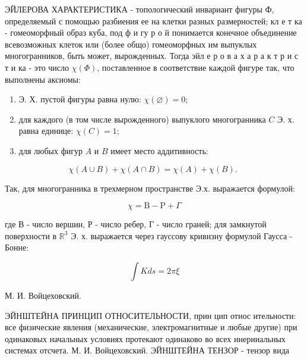 \documentclass[10pt]{article}
\begin{document}
ЭЙЛЕРОВА ХАРАКТЕРИСТИКА - топологический инвариант фигуры Ф, определяемый с помощью разбиения ее на клетки разных размерностей; кл е т ка - гомеоморфный образ куба, под ф и гу р о й понимается конечное объединение всевозможных клеток или (более общо) гомеоморфных им выпуклых многогранников, быть может, вырожденных. Тогда эйл е р о в а х а р а к т р и с т и ка - это число $\chi(\Phi)$, поставленное в соответствие каждой фигуре так, что выполнены аксиомы:



\begin{enumerate}

  \item Э. Х. пустой фигуры равна нулю: $\chi(\varnothing)=0$;



  \item для каждого (в том числе вырожденного) выпуклого многогранника $C$ Э. х. равна единице: $\chi(C)=1$;



  \item для любых фигур $A$ и $B$ имеет место аддитивность:



\end{enumerate}



\[

\chi(A \cup B)+\chi(A \cap B)=\chi(A)+\chi(B) \text {. }

\]



Так, для многогранника в трехмерном пространстве Э.х. выражается формулой:



\[

\chi=\mathrm{B}-\mathrm{P}+\Gamma

\]



где В - число вершин, Р - число ребер, Г - число граней; для замкнутой поверхности в $\mathbb{R}^{3}$ Э. х. выражается через гауссову кривизну формулой Гаусса - Бонне:



\[

\int K d s=2 \pi \xi

\]



М. И. Войцеховский.



ЭЙНШТЕЙНА ПРИНЦИП ОТНОСИТЕЛЬНОСТИ, прин цип относ ительности: все физические явления (механические, электромагнитные и любые другие) при одинаковых начальных условиях протекают одинаково во всех инерииальных системах отсчета. М. И. Войцеховский. ЭЙНШТЕЙНА ТЕНЗОР - тензор вида
\end{document}
